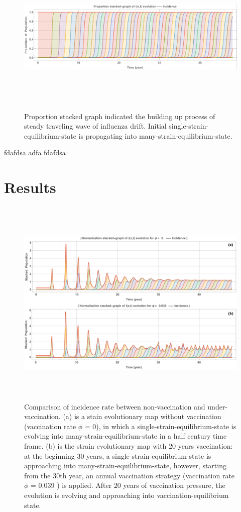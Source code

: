 \documentclass[preprint,12pt]{elsarticle}
\begin{document}
\begin{figure}
  \centering
  \includegraphics[width=6in,height=3in]{figures/Proportion}
  \caption{Proportion stacked graph indicated the building up process of steady traveling wave of influenza drift.
  Initial single-strain-equilibrium-state is propagating into many-strain-equilibrium-state.}
\label{fig:Proportion}
\end{figure}

fdafdsa
adfa
fdafdsa

\section{Results}

\begin{figure}
  \centering
  \includegraphics[width=6in,height=4in]{figures/UnderVaccination}
  \caption{Comparison of incidence rate between non-vaccination and under-vaccination.
  (a) is a stain evolutionary map without vaccination (vaccination rate \(\phi\) = 0), in which a single-strain-equilibrium-state is evolving into many-strain-equilibrium-state in a half century time frame. 
  (b) is the strain evolutionary map with 20 years vaccination: at the beginning 30 years, a single-strain-equilibrium-state is approaching into many-strain-equilibrium-state, however, starting from the 30th year, an annual vaccination strategy (vaccination rate \(\phi\) = 0.039 ) is applied. 
  After 20 years of vaccination pressure, the evolution is evolving and approaching into vaccination-equilibrium state.}
\label{fig:UnderVaccination}
\end{figure}
\end{document}

